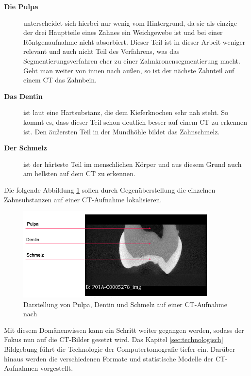 \begin{description}
	\item[\textbf{Die Pulpa}] unterscheidet sich hierbei nur wenig vom Hintergrund,
		da sie als einzige der drei Hauptteile eines Zahnes ein Weichgewebe ist und
		bei einer Röntgenaufnahme nicht absorbiert. Dieser Teil ist in dieser Arbeit
		weniger relevant und auch nicht Teil des Verfahrens, was das
		Segmentierungsverfahren eher zu einer Zahnkronensegmentierung macht. Geht man
		weiter von innen nach außen, so ist der nächste Zahnteil auf einem \ac{CT} das
		Zahnbein.

	\item[\textbf{Das Dentin}] ist laut \citet[S.~41]{lehmann2012Zahnheilkunde}
		eine Hartsubstanz, die dem Kieferknochen sehr nah steht. So kommt es, dass dieser
		Teil schon deutlich besser auf einem \ac{CT} zu erkennen ist. Den äußersten Teil
		in der Mundhöhle bildet das Zahnschmelz.

	\item[\textbf{Der Schmelz}] ist der härteste Teil im menschlichen Körper und aus
		diesem Grund auch am hellsten auf dem \ac{CT} zu erkennen.
\end{description}

Die folgende Abbildung \ref{fig:pulpa_dentin_schmelz} sollen durch Gegenüberstellung
die einzelnen Zahnsubstanzen auf einer \ac{CT}-Aufnahme lokalisieren.

\begin{figure}[h]
	\centering
	\includegraphics[width=0.9\textwidth]{img/dentin_schmelz_pulpa.png}
	\caption{Darstellung von Pulpa, Dentin und Schmelz auf einer \ac{CT}-Aufnahme
	nach \citet{heck2024}}
	\label{fig:pulpa_dentin_schmelz}
\end{figure}

Mit diesem Domänenwissen kann ein Schritt weiter gegangen werden, sodass der
Fokus nun auf die \ac{CT}-Bilder gesetzt wird. Das Kapitel
\ref{sec:technologisch} Bildgebung führt die Technologie der Computertomografie
tiefer ein. Darüber hinaus werden die verschiedenen Formate und statistische Modelle
der \ac{CT}-Aufnahmen vorgestellt.

